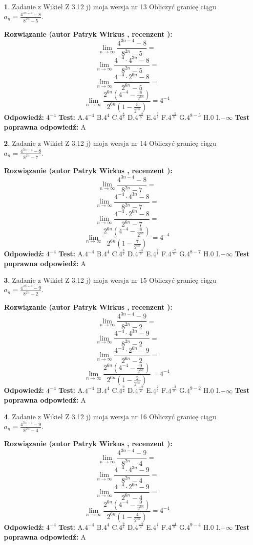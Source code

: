 \documentclass[12pt, a4paper]{article}
\theoremstyle{definition} %
\newtheorem{zad}{}
\newcommand{\zadStart}[1]{\begin{zad}#1\newline}
\newcommand{\zadStop}{\end{zad}}
\newcommand{\rozwStart}[2]{\noindent \textbf{Rozwiązanie (autor #1 , recenzent #2): }\newline}
\newcommand{\rozwStop}{\newline}
\newcommand{\odpStart}{\noindent \textbf{Odpowiedź:}\newline}
\newcommand{\odpStop}{\newline}
\newcommand{\testStart}{\noindent \textbf{Test:}\newline}
\newcommand{\testStop}{\newline}
\newcommand{\kluczStart}{\noindent \textbf{Test poprawna odpowiedź:}\newline}
\newcommand{\kluczStop}{\newline}
\begin{document}
\zadStart{Zadanie z Wikieł Z 3.12 j) moja wersja nr 13}
Obliczyć granicę ciągu $a_{n}=\frac{4^{3n-4}-8}{8^{2n}-5}$.
\zadStop
\rozwStart{Patryk Wirkus}{}
$$\lim\limits_{n\to\infty}\frac{4^{3n-4}-8}{8^{2n}-5}=$$
$$\lim\limits_{n\to\infty}\frac{4^{-4} \cdot 4^{3n}-8}{8^{2n}-5}=$$
$$\lim\limits_{n\to\infty}\frac{4^{-4} \cdot 2^{6n}-8}{2^{6n}-5}=$$
$$\lim\limits_{n\to\infty}\frac{2^{6n}(4^{-4} - \frac{8}{2^{6n}})}{2^{6n}(1-\frac{5}{2^{6n}})}= 4^{-4}$$
\rozwStop
\odpStart
$4^{-4}$
\odpStop
\testStart
A.$4^{-4}$
B.$4^{4}$
C.$4^{\frac{8}{5}}$
D.$4^{\frac{-8}{5}}$
E.$4^{\frac{5}{8}}$
F.$4^{\frac{-5}{8}}$
G.$4^{8-5}$
H.$0$
I.$-\infty$
\testStop
\kluczStart
A
\kluczStop



\zadStart{Zadanie z Wikieł Z 3.12 j) moja wersja nr 14}
Obliczyć granicę ciągu $a_{n}=\frac{4^{3n-4}-8}{8^{2n}-7}$.
\zadStop
\rozwStart{Patryk Wirkus}{}
$$\lim\limits_{n\to\infty}\frac{4^{3n-4}-8}{8^{2n}-7}=$$
$$\lim\limits_{n\to\infty}\frac{4^{-4} \cdot 4^{3n}-8}{8^{2n}-7}=$$
$$\lim\limits_{n\to\infty}\frac{4^{-4} \cdot 2^{6n}-8}{2^{6n}-7}=$$
$$\lim\limits_{n\to\infty}\frac{2^{6n}(4^{-4} - \frac{8}{2^{6n}})}{2^{6n}(1-\frac{7}{2^{6n}})}= 4^{-4}$$
\rozwStop
\odpStart
$4^{-4}$
\odpStop
\testStart
A.$4^{-4}$
B.$4^{4}$
C.$4^{\frac{8}{7}}$
D.$4^{\frac{-8}{7}}$
E.$4^{\frac{7}{8}}$
F.$4^{\frac{-7}{8}}$
G.$4^{8-7}$
H.$0$
I.$-\infty$
\testStop
\kluczStart
A
\kluczStop



\zadStart{Zadanie z Wikieł Z 3.12 j) moja wersja nr 15}
Obliczyć granicę ciągu $a_{n}=\frac{4^{3n-4}-9}{8^{2n}-2}$.
\zadStop
\rozwStart{Patryk Wirkus}{}
$$\lim\limits_{n\to\infty}\frac{4^{3n-4}-9}{8^{2n}-2}=$$
$$\lim\limits_{n\to\infty}\frac{4^{-4} \cdot 4^{3n}-9}{8^{2n}-2}=$$
$$\lim\limits_{n\to\infty}\frac{4^{-4} \cdot 2^{6n}-9}{2^{6n}-2}=$$
$$\lim\limits_{n\to\infty}\frac{2^{6n}(4^{-4} - \frac{9}{2^{6n}})}{2^{6n}(1-\frac{2}{2^{6n}})}= 4^{-4}$$
\rozwStop
\odpStart
$4^{-4}$
\odpStop
\testStart
A.$4^{-4}$
B.$4^{4}$
C.$4^{\frac{9}{2}}$
D.$4^{\frac{-9}{2}}$
E.$4^{\frac{2}{9}}$
F.$4^{\frac{-2}{9}}$
G.$4^{9-2}$
H.$0$
I.$-\infty$
\testStop
\kluczStart
A
\kluczStop



\zadStart{Zadanie z Wikieł Z 3.12 j) moja wersja nr 16}
Obliczyć granicę ciągu $a_{n}=\frac{4^{3n-4}-9}{8^{2n}-4}$.
\zadStop
\rozwStart{Patryk Wirkus}{}
$$\lim\limits_{n\to\infty}\frac{4^{3n-4}-9}{8^{2n}-4}=$$
$$\lim\limits_{n\to\infty}\frac{4^{-4} \cdot 4^{3n}-9}{8^{2n}-4}=$$
$$\lim\limits_{n\to\infty}\frac{4^{-4} \cdot 2^{6n}-9}{2^{6n}-4}=$$
$$\lim\limits_{n\to\infty}\frac{2^{6n}(4^{-4} - \frac{9}{2^{6n}})}{2^{6n}(1-\frac{4}{2^{6n}})}= 4^{-4}$$
\rozwStop
\odpStart
$4^{-4}$
\odpStop
\testStart
A.$4^{-4}$
B.$4^{4}$
C.$4^{\frac{9}{4}}$
D.$4^{\frac{-9}{4}}$
E.$4^{\frac{4}{9}}$
F.$4^{\frac{-4}{9}}$
G.$4^{9-4}$
H.$0$
I.$-\infty$
\testStop
\kluczStart
A
\kluczStop
\end{document}
